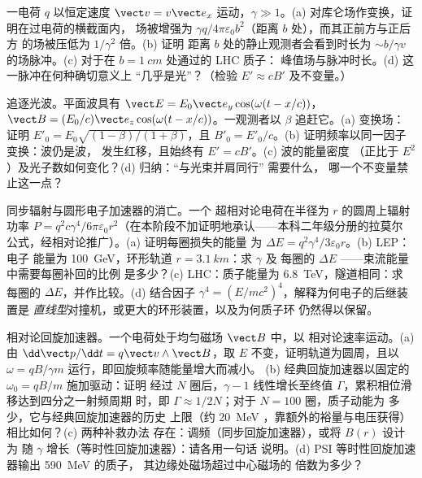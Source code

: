 \begin{exercise}[$\star\star$]\label{exo:b3:covariant-electromagnetism:9}
一电荷 $q$ 以恒定速度 $\vect v = v\vect e_x$ 运动，$\gamma \gg
1$。(a) 对库仑场作变换，证明在过电荷的横截面内，
场被增强为 $\gamma
q/4\pi\varepsilon_0b^2$（距离 $b$ 处），而其正前方与正后方
的场被压低为 $1/\gamma^2$ 倍。(b) 证明
距离 $b$ 处的静止观测者会看到时长为
$\sim b/\gamma v$ 的场脉冲。(c) 对于在 $b = \qty{1}{cm}$ 处通过的 LHC 质子：
峰值场与脉冲时长。(d) 这一脉冲在何种确切意义上
“几乎是光”？（检验 $E' \approx cB'$ 及不变量。）
\end{exercise}

\begin{exercise}[$\star\star\star$]\label{exo:b3:covariant-electromagnetism:10}
追逐光波。平面波具有 $\vect E = E_0\vect e_y
\cos(\omega(t - x/c))$，$\vect B = (E_0/c)\vect e_z\cos(\omega(t -
x/c))$。一观测者以 $\beta$ 追赶它。(a) 变换场：
证明 $E'_0 = E_0\sqrt{(1-\beta)/(1+\beta)}$，且 $B'_0 = E'_0/c$。(b)
证明频率以同一因子变换：波仍是波，
发生红移，且始终有 $E' = cB'$。(c) 波的能量密度
（正比于 $E^2$）及光子数如何变化？(d) 归纳：“与光束并肩同行”
需要什么，
哪一个不变量禁止这一点？
\end{exercise}

\begin{exercise}[$\star\star\star$]\label{exo:b3:covariant-electromagnetism:11}
同步辐射与圆形电子加速器的消亡。一个
超相对论电荷在半径为 $r$ 的圆周上辐射功率
$P = q^2c\gamma^4/6\pi\varepsilon_0r^2$（在本阶段不加证明地承认——本科二年级分册的拉莫尔
公式，经相对论推广）。(a) 证明每圈损失的能量
为 $\Delta E = q^2\gamma^4/3\varepsilon_0r$。(b) LEP：电子
能量为 \qty{100}{GeV}，环形轨道 $r = \qty{3.1}{km}$：求 $\gamma$ 及
每圈的 $\Delta E$ ——束流能量中需要每圈补回的比例
是多少？(c) LHC：质子能量为 \qty{6.8}{TeV}，隧道相同：求
每圈的 $\Delta E$，并作比较。(d) 结合因子 $\gamma^4 =
(E/mc^2)^4$，解释为何电子的后继装置是
\emph{直线型}对撞机，或更大的环形装置，以及为何质子环
仍然得以保留。
\end{exercise}

\begin{exercise}[$\star\star\star$]\label{exo:b3:covariant-electromagnetism:12}
相对论回旋加速器。一个电荷处于均匀磁场 $\vect B$ 中，以
相对论速率运动。(a) 由 $\dd\vect p/\dd t = q\vect v\wedge\vect
B$，取 $E$ 不变，证明轨道为圆周，且以
$\omega = qB/\gamma m$ 运行，即回旋频率随能量增大而减小。
(b) 经典回旋加速器以固定的 $\omega_0 = qB/m$ 施加驱动：证明
经过 $N$ 圈后，$\gamma - 1$ 线性增长至终值
$\Gamma$，累积相位滑移达到四分之一射频周期
时，即 $\Gamma \approx 1/2N$；对于 $N = 100$ 圈，质子动能为
多少，它与经典回旋加速器的历史
上限（约 \qty{20}{MeV}
，靠额外的裕量与电压获得）相比如何？(c) 两种补救办法
存在：调频（同步回旋加速器），或将 $B(r)$ 设计为
随 $\gamma$ 增长（等时性回旋加速器）：请各用一句话
说明。(d) PSI 等时性回旋加速器输出 \qty{590}{MeV} 的质子，
其边缘处磁场超过中心磁场的
倍数为多少？
\end{exercise}

